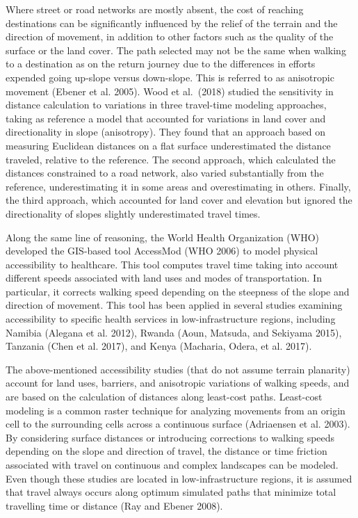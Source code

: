 \documentclass[]{elsarticle} %
\begin{document}
Where street or road networks are mostly absent, the cost of reaching
destinations can be significantly influenced by the relief of the
terrain and the direction of movement, in addition to other factors such
as the quality of the surface or the land cover. The path selected may
not be the same when walking to a destination as on the return journey
due to the differences in efforts expended going up-slope versus
down-slope. This is referred to as anisotropic movement (Ebener et al.
2005). Wood et al.~(2018) studied the sensitivity in distance
calculation to variations in three travel-time modeling approaches,
taking as reference a model that accounted for variations in land cover
and directionality in slope (anisotropy). They found that an approach
based on measuring Euclidean distances on a flat surface underestimated
the distance traveled, relative to the reference. The second approach,
which calculated the distances constrained to a road network, also
varied substantially from the reference, underestimating it in some
areas and overestimating in others. Finally, the third approach, which
accounted for land cover and elevation but ignored the directionality of
slopes slightly underestimated travel times.

Along the same line of reasoning, the World Health Organization (WHO)
developed the GIS-based tool AccessMod (WHO 2006) to model physical
accessibility to healthcare. This tool computes travel time taking into
account different speeds associated with land uses and modes of
transportation. In particular, it corrects walking speed depending on
the steepness of the slope and direction of movement. This tool has been
applied in several studies examining accessibility to specific health
services in low-infrastructure regions, including Namibia (Alegana et
al. 2012), Rwanda (Aoun, Matsuda, and Sekiyama 2015), Tanzania (Chen et
al. 2017), and Kenya (Macharia, Odera, et al. 2017).

The above-mentioned accessibility studies (that do not assume terrain
planarity) account for land uses, barriers, and anisotropic variations
of walking speeds, and are based on the calculation of distances along
least-cost paths. Least-cost modeling is a common raster technique for
analyzing movements from an origin cell to the surrounding cells across
a continuous surface (Adriaensen et al. 2003). By considering surface
distances or introducing corrections to walking speeds depending on the
slope and direction of travel, the distance or time friction associated
with travel on continuous and complex landscapes can be modeled. Even
though these studies are located in low-infrastructure regions, it is
assumed that travel always occurs along optimum simulated paths that
minimize total travelling time or distance (Ray and Ebener 2008).
\end{document}
